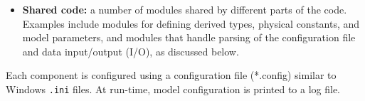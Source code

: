 \begin{itemize}
\item {\bf Shared code:} a number of modules shared by different parts of the code. 
Examples include modules for defining derived types, 
physical constants, and model parameters, and modules that handle parsing of 
the configuration file and data input/output (I/O), as discussed below.


\end{itemize}
%

%


Each component is configured using a configuration file (*.config) 
similar to Windows \texttt{.ini} files. At run-time, model configuration is printed
to a log file. 

